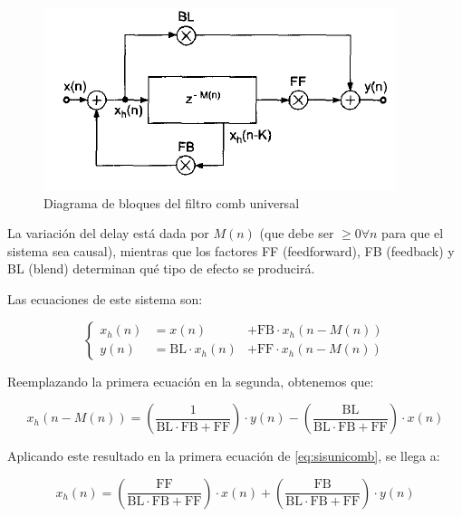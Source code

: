 \documentclass[assd_tp2_main.tex]{subfiles}
\begin{document}
\begin{figure}[!htb]
	\centering
	\includegraphics[scale=1]{graficos/EJ8/rochi/unicomb.png}
	\caption{Diagrama de bloques del filtro comb universal}
	\label{fig:unicomb}
\end{figure}


La variaci\'on del delay est\'a dada por $M(n)$ (que debe ser $\geq 0 \forall n$ para que el sistema sea causal), mientras que los factores FF (feedforward), FB (feedback) y BL (blend) determinan qu\'e tipo de efecto se producir\'a.

Las ecuaciones de este sistema son:

\begin{equation}
	\left\{
	\begin{aligned}
	x_h(n) 	&= x(n)& + \text{FB} \cdot x_h(n-M(n))	\\
	y(n) 	&= \text{BL} \cdot x_h(n) &+ 
				\text{FF} \cdot x_h(n-M(n))
	\end{aligned}
	\right.
	\label{eq:sisunicomb}
\end{equation}

 Reemplazando la primera ecuaci\'on en la segunda, obtenemos que:
 
 \begin{equation*}
 	x_h(n-M(n)) =  
 	\left( \frac{1}{\text{BL}\cdot \text{FB} + \text{FF}}\right) \cdot y(n) -
 	\left( \frac{\text{BL}}{\text{BL}\cdot \text{FB} + \text{FF}}\right) \cdot x(n) 
	\label{eq:xhk} 
 \end{equation*}
 
 
 Aplicando este resultado en la primera ecuaci\'on de \ref{eq:sisunicomb}, se llega a:
 
 \begin{equation}
 	x_h(n) = 
 	\left( \frac{\text{FF}}{\text{BL}\cdot \text{FB} + \text{FF}}\right) \cdot x(n) +
 	\left( \frac{\text{FB}}{\text{BL}\cdot \text{FB} + \text{FF}}\right) \cdot y(n) 
 	\label{eq:xh}
 \end{equation}
\end{document}
